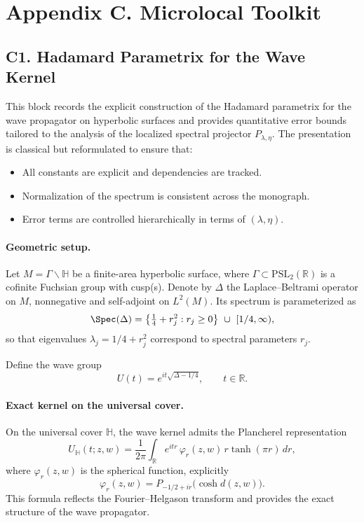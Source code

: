 \section*{Appendix C. Microlocal Toolkit}

\subsection*{C1. Hadamard Parametrix for the Wave Kernel}

\noindent
This block records the explicit construction of the Hadamard parametrix
for the wave propagator on hyperbolic surfaces and provides quantitative
error bounds tailored to the analysis of the localized spectral projector
$P_{\lambda,\eta}$. The presentation is classical but reformulated to
ensure that:
\begin{itemize}
  \item All constants are explicit and dependencies are tracked.
  \item Normalization of the spectrum is consistent across the monograph.
  \item Error terms are controlled hierarchically in terms of $(\lambda,\eta)$.
\end{itemize}

\paragraph{Geometric setup.}
Let $M = \Gamma \backslash \mathbb{H}$ be a finite-area hyperbolic surface,
where $\Gamma \subset \mathrm{PSL}_2(\mathbb{R})$ is a cofinite Fuchsian group
with cusp(s). Denote by $\Delta$ the Laplace--Beltrami operator on $M$,
nonnegative and self-adjoint on $L^2(M)$. Its spectrum is parameterized as
\[
\Spec(\Delta) = \left\{ \tfrac14 + r_j^2 : r_j \ge 0 \right\}
\ \cup\ [1/4,\infty),
\]
so that eigenvalues $\lambda_j = 1/4 + r_j^2$ correspond to spectral parameters $r_j$.

Define the wave group
\[
U(t) = e^{it\sqrt{\Delta - 1/4}}, \qquad t \in \mathbb{R}.
\]

\paragraph{Exact kernel on the universal cover.}
On the universal cover $\mathbb{H}$, the wave kernel admits the Plancherel
representation
\[
U_{\mathbb{H}}(t; z, w) = \frac{1}{2\pi} \int_{\mathbb{R}}
e^{i t r}\, \varphi_r(z, w)\, r \tanh(\pi r)\, dr,
\]
where $\varphi_r(z,w)$ is the spherical function, explicitly
\[
\varphi_r(z,w) = P_{-1/2+ir}\big(\cosh d(z,w)\big).
\]
This formula reflects the Fourier--Helgason transform and provides
the exact structure of the wave propagator.

